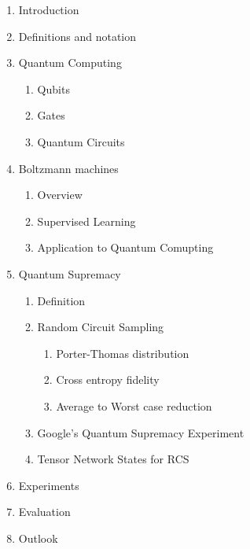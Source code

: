 \begin{enumerate}
  \item Introduction
  \item Definitions and notation
  \item Quantum Computing
  \begin{enumerate}
    \item Qubits 
    \item Gates
    \item Quantum Circuits
  \end{enumerate}
  \item Boltzmann machines
  \begin{enumerate}
    \item Overview
    \item Supervised Learning
    \item Application to Quantum Comupting
  \end{enumerate}
  \item Quantum Supremacy
  \begin{enumerate}
    \item Definition 
    \item Random Circuit Sampling
    \begin{enumerate}
      \item Porter-Thomas distribution
      \item Cross entropy fidelity
      \item Average to Worst case reduction
    \end{enumerate}
    \item Google's Quantum Supremacy Experiment
    \item Tensor Network States for RCS
  \end{enumerate}
  \item Experiments
  \item Evaluation
  \item Outlook
\end{enumerate}